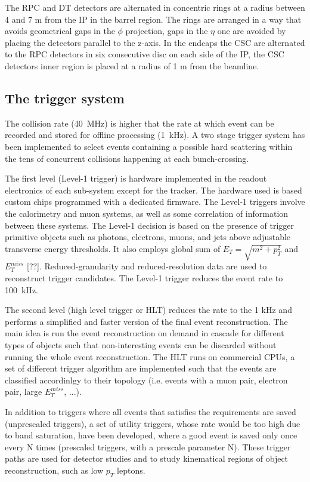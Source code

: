 The RPC and DT detectors are alternated in concentric rings at a radius between 4 and 7 m from the IP
in the barrel region. The rings are arranged in a way that avoids geometrical gaps in the $\phi $ projection, gaps
in the $\eta $ one are avoided by placing the detectors parallel to the z-axis.
In the endcaps the CSC are alternated to the RPC detectors in six consecutive disc on each side of the IP, the CSC
detectors inner region is placed at a radius of 1 m from the beamline.

\subsection{The trigger system}
The collision rate (40~MHz) is higher that the rate at which event can be recorded and stored for
offline processing (1~kHz). A two stage trigger system has been implemented to select events containing
a possible hard scattering within the tens of concurrent collisions happening at each bunch-crossing.

The first level (Level-1 trigger) is hardware  implemented in the readout electronics of each sub-system except for
the tracker. The hardware used is based custom chips programmed with a dedicated firmware.
The Level-1 triggers involve the calorimetry and muon systems, as well as some correlation
of information between these systems. The Level-1 decision is based on the presence of trigger
primitive objects such as photons, electrons, muons, and jets above adjustable transverse energy thresholds.
It also employs global sum of $E_T = \sqrt{m^2 + p_T^2}$ and $E_T^{miss}$ [??]. Reduced-granularity and
reduced-resolution data are used to reconstruct trigger candidates.
The Level-1 trigger reduces the event rate to 100~kHz.

The second level (high level trigger or HLT) reduces the rate to the 1 kHz and performs a simplified and faster
version of the final event reconstruction. The main idea is run the event reconstruction on demand in cascade for
different types of objects such that non-interesting events can be discarded without running the whole
event reconstruction. The HLT runs on commercial CPUs, 
a set of different trigger algorithm are implemented such that the events are classified accordinlgy
to their topology (i.e. events with a muon pair, electron pair, large $E_T^{miss}$, ...).

In addition to triggers where all events that satisfies the requirements are saved (unprescaled
triggers), a set of utility triggers, whose rate would be too high due to band saturation, have
been developed, where a good event is saved only once every N times (prescaled triggers, with
a prescale parameter N). These trigger paths are used for detector studies and to study kinematical
regions of object reconstruction, such as low $p_T$ leptons.

